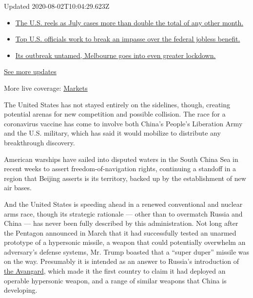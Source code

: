 Updated 2020-08-02T10:04:29.623Z

\begin{itemize}
\tightlist
\item
  \href{https://www.nytimes.com/2020/08/01/world/coronavirus-covid-19.html?action=click\&pgtype=Article\&state=default\&region=MAIN_CONTENT_1\&context=storylines_live_updates\#link-34047410}{The
  U.S. reels as July cases more than double the total of any other
  month.}
\item
  \href{https://www.nytimes.com/2020/08/01/world/coronavirus-covid-19.html?action=click\&pgtype=Article\&state=default\&region=MAIN_CONTENT_1\&context=storylines_live_updates\#link-780ec966}{Top
  U.S. officials work to break an impasse over the federal jobless
  benefit.}
\item
  \href{https://www.nytimes.com/2020/08/01/world/coronavirus-covid-19.html?action=click\&pgtype=Article\&state=default\&region=MAIN_CONTENT_1\&context=storylines_live_updates\#link-2bc8948}{Its
  outbreak untamed, Melbourne goes into even greater lockdown.}
\end{itemize}

\href{https://www.nytimes.com/2020/08/01/world/coronavirus-covid-19.html?action=click\&pgtype=Article\&state=default\&region=MAIN_CONTENT_1\&context=storylines_live_updates}{See
more updates}

More live coverage:
\href{https://www.nytimes.com/live/2020/07/31/business/stock-market-today-coronavirus?action=click\&pgtype=Article\&state=default\&region=MAIN_CONTENT_1\&context=storylines_live_updates}{Markets}

The United States has not stayed entirely on the sidelines, though,
creating potential arenas for new competition and possible collision.
The race for a coronavirus vaccine has come to involve both China's
People's Liberation Army and the U.S. military, which has said it would
mobilize to distribute any breakthrough discovery.

American warships have sailed into disputed waters in the South China
Sea in recent weeks to assert freedom-of-navigation rights, continuing a
standoff in a region that Beijing asserts is its territory, backed up by
the establishment of new air bases.

And the United States is speeding ahead in a renewed conventional and
nuclear arms race, though its strategic rationale --- other than to
overmatch Russia and China --- has never been fully described by this
administration. Not long after the Pentagon announced in March that it
had successfully tested an unarmed prototype of a hypersonic missile, a
weapon that could potentially overwhelm an adversary's defense systems,
Mr. Trump boasted that a ``super duper'' missile was on the way.
Presumably it is intended as an answer to Russia's introduction of
\href{https://www.nytimes.com/2019/12/27/us/politics/russia-hypersonic-weapon.html}{the
Avangard}, which made it the first country to claim it had deployed an
operable hypersonic weapon, and a range of similar weapons that China is
developing.

